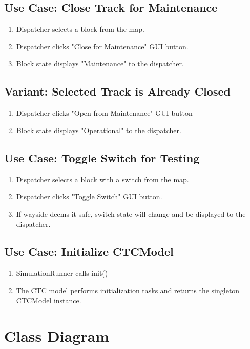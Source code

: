 \documentclass{scrreprt}
\begin{document}
\subsection{Use Case: Close Track for Maintenance}
\begin{enumerate}
	\item Dispatcher selects a block from the map.
	\item Dispatcher clicks "Close for Maintenance" GUI button.
	\item Block state displays "Maintenance" to the dispatcher.
\end{enumerate}

\subsection{Variant: Selected Track is Already Closed}
\begin{enumerate}[label=\arabic*a., start=2]
	\item Dispatcher clicks "Open from Maintenance" GUI button
	\item Block state displays "Operational" to the dispatcher.
\end{enumerate}

\subsection{Use Case: Toggle Switch for Testing}
\begin{enumerate}
	\item Dispatcher selects a block with a switch from the map.
	\item Dispatcher clicks "Toggle Switch" GUI button.
	\item If wayside deems it safe, switch state will change and be displayed to the dispatcher.
\end{enumerate}

\subsection{Use Case: Initialize CTCModel}
\begin{enumerate}
	\item SimulationRunner calls init()
	\item The CTC model performs initialization tasks and returns the singleton CTCModel instance.
\end{enumerate}


\section{Class Diagram}
\end{document}
